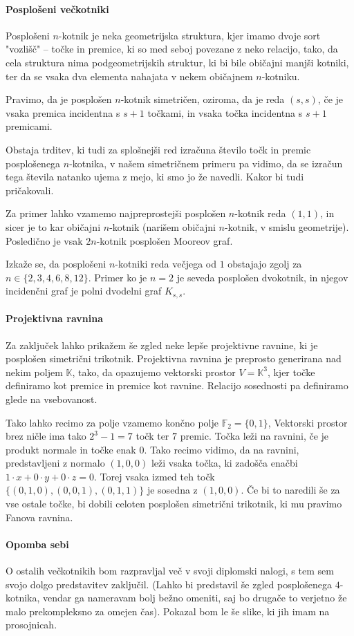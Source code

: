 \documentclass{fmfkpb}
\begin{document}
\paragraph{Posplošeni večkotniki}
Posplošeni $n$-kotnik je neka geometrijska struktura, 
kjer imamo dvoje sort "vozlišč" -- točke in premice, 
ki so med seboj povezane z neko relacijo, tako, da cela struktura nima 
podgeometrijskih struktur, ki bi bile običajni manjši kotniki,
ter da se vsaka dva elementa nahajata v nekem običajnem $n$-kotniku.

Pravimo, da je posplošen $n$-kotnik simetričen, oziroma, da je reda $(s, s)$,
če je vsaka premica incidentna s $s + 1$ točkami, 
in vsaka točka incidentna s $s + 1$ premicami.

Obstaja trditev, ki tudi za splošnejši red izračuna število točk in premic
posplošenega $n$-kotnika, v našem simetričnem primeru pa vidimo, da se 
izračun tega števila natanko ujema z mejo, ki smo jo že navedli. Kakor bi 
tudi pričakovali.

Za primer lahko vzamemo najpreprostejši posplošen $n$-kotnik reda $(1, 1)$, in sicer 
je to kar običajni $n$-kotnik (narišem običajni $n$-kotnik, v smislu geometrije).
Posledično je vsak $2n$-kotnik posplošen Mooreov graf.

Izkaže se, da posplošeni $n$-kotniki reda večjega od $1$ obstajajo zgolj za $n \in \{2, 3, 4, 6, 8, 12\}$.
Primer ko je $n = 2$ je seveda posplošen dvokotnik, in njegov incidenčni graf
je polni dvodelni graf $K_{s, s}$. 


\paragraph{Projektivna ravnina}
Za zaključek lahko prikažem še zgled neke lepše projektivne ravnine, ki je 
posplošen simetrični trikotnik.
Projektivna ravnina je preprosto generirana nad nekim poljem $\mathbb{K}$, 
tako, da opazujemo vektorski prostor $V = \mathbb{K}^3$,
kjer točke definiramo kot premice in premice kot ravnine. Relacijo sosednosti
pa definiramo glede na vsebovanost.

Tako lahko recimo za polje vzamemo končno polje $\mathbb{F}_2 = \{0, 1\}$,
Vektorski prostor brez ničle ima tako $2^3 - 1 = 7$ točk ter $7$ premic.
Točka leži na ravnini, če je produkt normale in točke enak $0$.
Tako recimo vidimo, da na ravnini, predstavljeni z normalo $(1, 0, 0)$ 
leži
vsaka točka, ki zadošča enačbi $1\cdot x + 0\cdot y + 0\cdot z = 0$. 
Torej vsaka izmed teh točk $\{(0,1,0),(0,0,1),(0,1,1)\}$ je sosedna z $(1, 0, 0)$.
Če bi to naredili še za vse ostale točke, bi dobili celoten posplošen 
simetrični trikotnik, ki mu pravimo Fanova ravnina.

\paragraph{Opomba sebi}
O ostalih večkotnikih bom razpravljal več v svoji diplomski nalogi,
s tem sem svojo dolgo predstavitev zaključil. 
(Lahko bi predstavil še zgled posplošenega $4$-kotnika, vendar ga nameravam bolj bežno omeniti,
saj bo drugače to verjetno že malo prekompleksno za omejen čas). Pokazal bom le še slike,
ki jih imam na prosojnicah.
\end{document}

